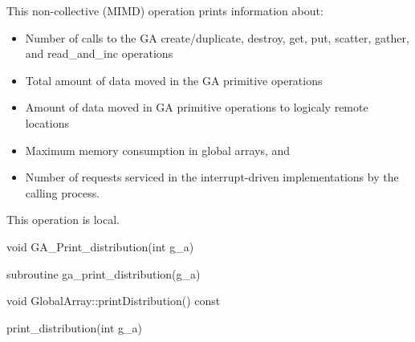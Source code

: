 \documentclass[12pt]{article}
\begin{document}
\begin{desc}

This non-collective (MIMD) operation prints information about:
\begin{itemize}
    \item Number of calls to the GA create/duplicate, destroy, get, 
     put, scatter, gather, and read_and_inc operations
    \item Total amount of data moved in the GA primitive operations
    \item Amount of data moved in GA primitive operations to logicaly 
     remote locations
    \item Maximum memory consumption in global arrays, and
    \item Number of requests serviced in the interrupt-driven implementations 
     by the calling process.
\end{itemize}

This operation is local.
\end{desc}


\begin{capi}
\begin{ccode}
void GA_Print_distribution(int g_a)
\end{ccode}
\begin{funcargs}
\end{funcargs}
\end{capi}

\begin{fapi}
\begin{fcode}
subroutine ga_print_distribution(g_a)   
\end{fcode}
\begin{funcargs}
\end{funcargs}
\end{fapi}

\begin{cxxapi}
\begin{cxxcode}
void GlobalArray::printDistribution() const
\end{cxxcode}
\end{cxxapi}

\begin{pyapi}
\begin{pycode}
print_distribution(int g_a) 
\end{pycode}
\end{pyapi} 
\end{document}
